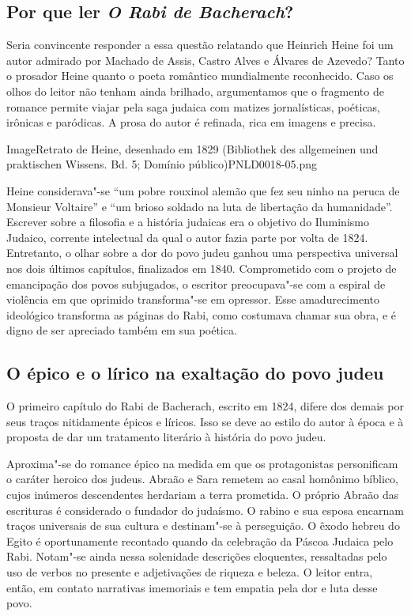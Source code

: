 \documentclass[12pt]{extarticle}
\begin{document}
\subsection{Por que ler \textit{O Rabi de Bacherach}?}

Seria convincente responder a essa questão relatando que Heinrich Heine
foi um autor admirado por Machado de Assis, Castro Alves e Álvares de
Azevedo? Tanto o prosador Heine quanto o poeta romântico mundialmente
reconhecido. Caso os olhos do leitor não tenham ainda brilhado,
argumentamos que o fragmento de romance permite viajar pela saga judaica
com matizes jornalísticas, poéticas, irônicas e paródicas. A prosa do
autor é refinada, rica em imagens e precisa.


Image{Retrato de Heine, desenhado em 1829 (Bibliothek des allgemeinen und praktischen Wissens. Bd. 5; Domínio público)}{PNLD0018-05.png}


Heine considerava"-se ``um pobre rouxinol alemão que fez seu ninho na
peruca de Monsieur Voltaire'' e ``um brioso soldado na luta de
libertação da humanidade''. Escrever sobre a filosofia e a história
judaicas era o objetivo do Iluminismo Judaico, corrente intelectual da
qual o autor fazia parte por volta de 1824. Entretanto, o olhar sobre a
dor do povo judeu ganhou uma perspectiva universal nos dois últimos
capítulos, finalizados em 1840. Comprometido com o projeto de
emancipação dos povos subjugados, o escritor preocupava"-se com a espiral
de violência em que oprimido transforma"-se em opressor. Esse
amadurecimento ideológico transforma as páginas do Rabi, como costumava
chamar sua obra, e é digno de ser apreciado também em sua poética.





\subsection{O épico e o lírico na exaltação do povo judeu}

O primeiro capítulo do Rabi de Bacherach, escrito em 1824, difere dos
demais por seus traços nitidamente épicos e líricos. Isso se deve ao
estilo do autor à época e à proposta de dar um tratamento literário à
história do povo judeu.

Aproxima"-se do romance épico na medida em que os protagonistas
personificam o caráter heroico dos judeus. Abraão e Sara remetem ao
casal homônimo bíblico, cujos inúmeros descendentes herdariam a terra
prometida. O próprio Abraão das escrituras é considerado o fundador do
judaísmo. O rabino e sua esposa encarnam traços universais de sua
cultura e destinam"-se à perseguição. O êxodo hebreu do Egito é
oportunamente recontado quando da celebração da Páscoa Judaica pelo
Rabi. Notam"-se ainda nessa solenidade descrições eloquentes, ressaltadas
pelo uso de verbos no presente e adjetivações de riqueza e beleza. O
leitor entra, então, em contato narrativas imemoriais e tem empatia pela
dor e luta desse povo.
\end{document}
